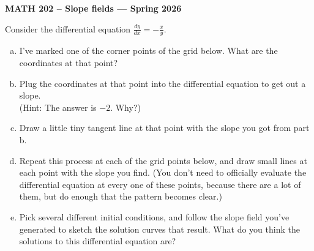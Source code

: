 \documentclass[12pt]{article}
\begin{document}
\thispagestyle{empty}
\begin{center}
  \textbf{ MATH 202 -- Slope fields 
  --- Spring 2026
    }
\end{center}

Consider the differential equation $\frac{dy}{dx} = -\frac{x}{y}.$
\begin{enumerate}[a.]
\item I've marked one of the corner points of the grid below. What are the coordinates at that point? 
\item Plug the coordinates at that point into the differential equation to get out a slope. \\
(Hint: The answer is $-2$. Why?)
\item Draw a little tiny tangent line at that point with the slope you got from part b.
\item Repeat this process at each of the grid points below,
and draw small lines at each point with the slope you find.
(You don't need to officially evaluate the differential equation at every
one of these points, because there are a lot of them, but do enough
that the pattern becomes clear.)
\begin{center}
\end{center}
\item Pick several different initial conditions, and follow the slope field 
you've generated to sketch the solution curves that result. What do you think
the solutions to this differential equation are?
\end{enumerate}
\end{document}
